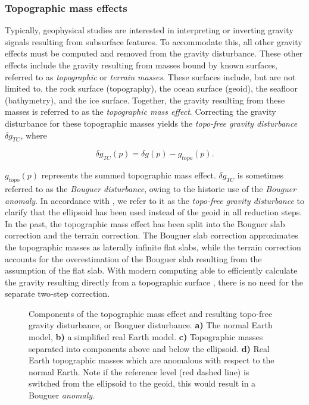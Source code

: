 \subsubsection{Topographic mass effects} \label{chp4_topo_mass_effect}

Typically, geophysical studies are interested in interpreting or inverting gravity signals resulting from subsurface features. To accommodate this, all other gravity effects must be computed and removed from the gravity disturbance. These other effects include the gravity resulting from masses bound by known surfaces, referred to as \textit{topographic} or \textit{terrain masses}. These surfaces include, but are not limited to, the rock surface (topography), the ocean surface (geoid), the seafloor (bathymetry), and the ice surface. Together, the gravity resulting from these masses is referred to as the \textit{topographic mass effect}. Correcting the gravity disturbance for these topographic masses yields the \textit{topo-free gravity disturbance} $\delta g_{TC}$, where

\begin{equation} \label{chp4:eq:bouguer_disturbance}
    \delta g_{TC}(p) = \delta g(p) - g_{topo}(p).
\end{equation}

$g_{topo}(p)$ represents the summed topographic mass effect. $\delta g_{TC}$ is sometimes referred to as the \textit{Bouguer disturbance}, owing to the historic use of the \textit{Bouguer anomaly}. In accordance with \citet{vajdasecondary2007}, we refer to it as the \textit{topo-free gravity disturbance} to clarify that the ellipsoid has been used instead of the geoid in all reduction steps. In the past, the topographic mass effect has been split into the Bouguer slab correction and the terrain correction. The Bouguer slab correction approximates the topographic masses as laterally infinite flat slabs, while the terrain correction accounts for the overestimation of the Bouguer slab resulting from the assumption of the flat slab. With modern computing able to efficiently calculate the gravity resulting directly from a topographic surface \citep{fatiandoaterraprojectharmonica2023}, there is no need for the separate two-step correction. \\

\begin{figure}[!ht]
    \centering
    
    \caption[Components of the topographic mass effect]{Components of the topographic mass effect and resulting topo-free gravity disturbance, or Bouguer disturbance. \textbf{a)} The normal Earth model, \textbf{b)} a simplified real Earth model. \textbf{c)} Topographic masses separated into components above and below the ellipsoid. \textbf{d)} Real Earth topographic masses which are anomalous with respect to the normal Earth. Note if the reference level (red dashed line) is switched from the ellipsoid to the geoid, this would result in a Bouguer \textit{anomaly}.}
    \label{fig:chp4_terrain_effects}
\end{figure}

